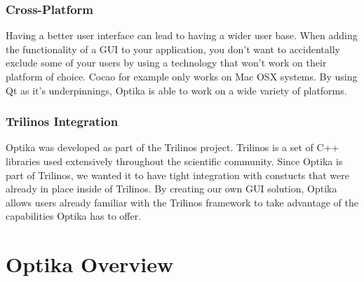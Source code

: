 \subsubsection{Cross-Platform}
Having a better user interface can lead to having a wider user base. When adding the functionality
of a GUI to your application, you don't want to accidentally exclude some of your users by
using a technology that won't work on their platform of choice. Cocao for example only works on
Mac OSX systems. By using Qt as it's underpinnings, Optika is able to work on a wide variety of
platforms.

\subsubsection{Trilinos Integration}
Optika was developed as part of the Trilinos project. Trilinos is a set of C++ libraries
used extensively throughout the scientific community. Since Optika is part of Trilinos,
we wanted it to have tight integration with constucts that were already in place inside
of Trilinos. By creating our own GUI solution, Optika allows users already familiar
with the Trilinos framework to take advantage of the capabilities Optika has to offer.

\section{Optika Overview}
